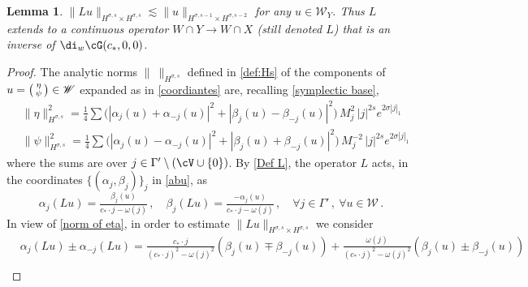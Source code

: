 \documentclass[11pt,a4paper,reqno]{article}
\numberwithin{equation}{section}
\newtheorem{lemma}[theorem]{Lemma}
\theoremstyle{definition}
\begin{document}
\begin{appendix}
   \begin{lemma}
\label{continuity of L}
       $  \|Lu\|_{H^{\sigma,s}\times H^{\sigma,s}}\lesssim \|u\|_{H^{\sigma,s-1}\times H^{\sigma,s-2}}$ 
       for any $ u \in \mathscr{W}_Y $. Thus $L$ extends to a continuous operator $W\cap Y\to W\cap X$ (still denoted $L$) that is
    an inverse of $ \di_w\cG(c_*,0,0) $.  
    \end{lemma}
    
    \begin{proof}
The analytic norms $ \| \ \|_{H^{\sigma,s}} $ defined in  \eqref{def:Hs} of the components of
          $ u  = \begin{psmallmatrix}
          \eta \\ \psi 
          \end{psmallmatrix}
        \in \mathscr{W}$ expanded as in  
\eqref{coordiantes} are, recalling \eqref{symplectic base}, 
\begin{equation}
        \begin{aligned}
        \label{norm of eta}
            &\|\eta\|^2_{H^{\sigma,s}}=\tfrac{1}{4}\sum \big(|\alpha_j(u)+\alpha_{-j}(u)|^2+|\beta_j(u)-\beta_{-j}(u)|^2\big)\, M_j^2\, | j|^{2s}e^{2\sigma |j|_1}\\
            &\|\psi\|^2_{H^{\sigma,s}}=\tfrac{1}{4}\sum \big(|\alpha_j(u)-\alpha_{-j}(u)|^2+|\beta_j(u)+\beta_{-j}(u)|^2\big)\, M_j^{-2}\, | j|^{2s}e^{2\sigma |j|_1}
        \end{aligned}
        \end{equation}
        where the sums are over $ j \in \Gamma'\setminus(\cV\cup \{0\})$.
       By \eqref{Def L},    the operator $ L $ 
       acts, in the coordinates $\{(\alpha_j,\beta_j)\}_{j}$ in \eqref{abu},  as
        $$      \alpha_j(Lu)=
        \tfrac{\beta_j(u)}{c_*\cdot j-\omega(j)} \, , \quad 
                \beta_j(Lu)
                =\tfrac{-\alpha_j(u)}{c_*\cdot j-\omega(j)} \, , 
            \quad \forall j \in \Gamma'\, , \  \forall u\in \mathscr{W} \, . 
      $$
     In view of  \eqref{norm of eta},   in order to estimate $\|Lu\|_{H^{\sigma,s}\times H^{\sigma,s}}$ we consider
       \begin{equation}\label{alpha  pm alpha beta pm beta}
           \begin{aligned}
               &\alpha_j(Lu) \pm \alpha_{-j}(Lu)=
                    \tfrac{c_*\cdot j}{(c_*\cdot j)^2-\omega(j)^2}(\beta_j(u) \mp \beta_{-j}(u))+
                    \tfrac{\omega(j)}{(c_*\cdot j)^2- \omega(j)^2}(\beta_j(u) \pm \beta_{-j}(u))\\

\end{aligned}
\end{equation}
\end{proof}
\end{appendix}
\end{document}
